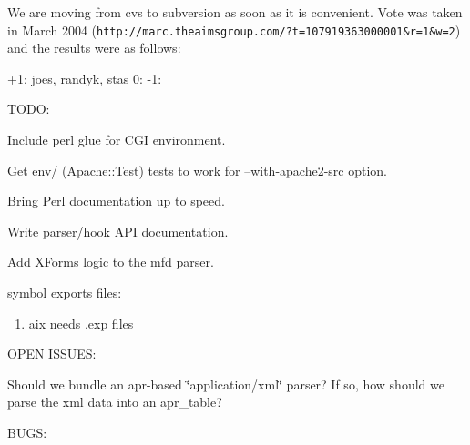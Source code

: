 \begin{CompactItemize}
\item 
We are moving from cvs to subversion as soon as it is convenient. Vote was taken in March 2004 ({\tt http://marc.theaimsgroup.com/?t=107919363000001\&r=1\&w=2}) and the results were as follows:\end{CompactItemize}
+1: joes, randyk, stas 0: -1:

TODO:

\begin{CompactItemize}
\item 
Include perl glue for CGI environment.\end{CompactItemize}
\begin{CompactItemize}
\item 
Get env/ (Apache::Test) tests to work for --with-apache2-src option.\end{CompactItemize}
\begin{CompactItemize}
\item 
Bring Perl documentation up to speed.\end{CompactItemize}
\begin{CompactItemize}
\item 
Write parser/hook API documentation.\end{CompactItemize}
\begin{CompactItemize}
\item 
Add XForms logic to the mfd parser.\end{CompactItemize}
\begin{CompactItemize}
\item 
symbol exports files:\begin{enumerate}
\item 
aix needs .exp files\end{enumerate}
\end{CompactItemize}
OPEN ISSUES:

\begin{CompactItemize}
\item 
Should we bundle an apr-based \char`\"{}application/xml\char`\"{} parser?  If so, how should we parse the xml data into an apr\_\-table?\end{CompactItemize}
BUGS:

